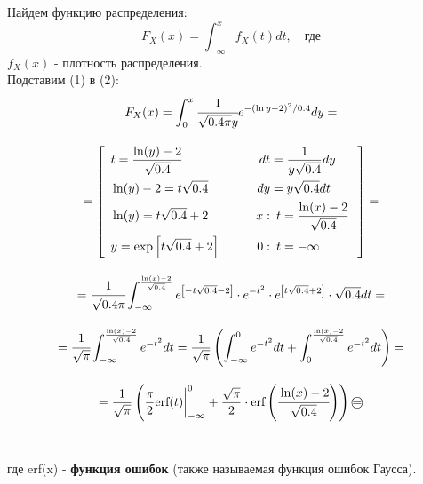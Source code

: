 \documentclass[a4paper, 14pt]{extarticle}
\begin{document}
Найдем функцию распределения:
\begin{equation}
    F_X(x) = \int_{-\infty}^{x} f_X(t) dt, \quad \text{где}
\end{equation}
$f_X(x)$ - плотность распределения.\\

Подставим (1) в (2):
\begin{gather*}
    F_X(x) = 
    \int_{0}^{x} \cfrac{1}{\sqrt{0.4 \pi}y} e^{-(\ln{y} - 2)^2 / 0.4} dy = \\[1em]
    = \left[\hspace{5pt}
    \begin{aligned}
        & t          = \frac{\ln(y)-2}{\sqrt{0.4}}          \qquad & dt &   = \frac{1}{y \sqrt{0.4}} dy   \\
        & \ln(y) - 2 = t \sqrt{0.4}                         \qquad & dy &   = y \sqrt{0.4} dt             \\
        & \ln(y)     = t \sqrt{0.4} + 2                     \qquad & x: & \hspace{5pt} t = \frac{\ln(x)-2}{\sqrt{0.4}} \\
        & y          = \exp \left[ t \sqrt{0.4} + 2 \right] \qquad & 0: & \hspace{5pt} t = -\infty                     \\ 
    \end{aligned}\,
    \hspace{5pt}\right] = \\[1em]
    = \cfrac{1}{\sqrt{0.4 \pi}} \int_{-\infty}^{\frac{\ln(x)-2}{\sqrt{0.4}}} e^{\left[ -t \sqrt{0.4} -2 \right]} 
    \cdot e^{-t^2} \cdot e^{\left[ t \sqrt{0.4} +2 \right]} \cdot \sqrt{0.4} dt = \\[1em]
    = \cfrac{1}{\sqrt{\pi}} \int_{-\infty}^{\frac{\ln(x)-2}{\sqrt{0.4}}} e^{-t^2} dt 
    = \frac{1}{\sqrt{\pi}} \left( \int_{-\infty}^{0} e^{-t^2} dt + \int_{0}^{\frac{\ln(x)-2}{\sqrt{0.4}}} e^{-t^2} dt \right) = \\[1em]
    = \frac{1}{\sqrt{\pi}} \left( \frac{\pi}{2} \text{erf} (t) \bigg|^0_{-\infty} + \frac{\sqrt{\pi}}{2} \cdot 
    \text{erf} \left( \cfrac{\ln(x)-2}{\sqrt{0.4}} \right) \right) \oeq
\end{gather*}\\
\vspace{10pt}
\begin{center}
    где erf(x) - \textbf{функция ошибок} (также называемая функция ошибок Гаусса).\\
\end{center}
\end{document}
